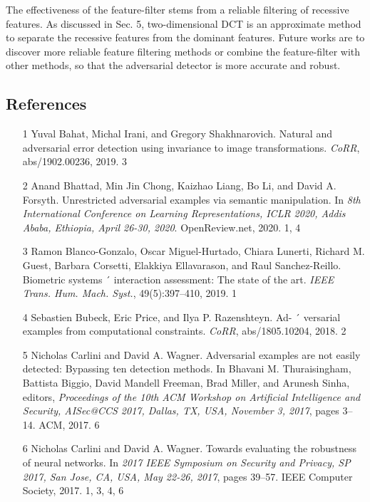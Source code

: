 \documentclass{article}
\begin{document}
The effectiveness of the feature-filter stems from a reliable filtering of recessive features. As discussed in Sec. 5, two-dimensional DCT is an approximate method to separate the recessive features from the dominant features. Future works are to discover more reliable feature filtering methods or combine the feature-filter with other methods, so that the adversarial detector is more accurate and robust.

\subsection{References}
\begin{itemize}
\item 
[1] Yuval Bahat, Michal Irani, and Gregory Shakhnarovich. Natural and adversarial error detection using invariance to image transformations. \textit{CoRR}, abs/1902.00236, 2019. 3

\item 
[2] Anand Bhattad, Min Jin Chong, Kaizhao Liang, Bo Li, and David A. Forsyth. Unrestricted adversarial examples via semantic manipulation. In \textit{8th International Conference on Learning Representations, ICLR 2020, Addis Ababa, Ethiopia, April 26-30, 2020}. OpenReview.net, 2020. 1, 4

\item 
[3] Ramon Blanco-Gonzalo, Oscar Miguel-Hurtado, Chiara Lunerti, Richard M. Guest, Barbara Corsetti, Elakkiya Ellavarason, and Raul Sanchez-Reillo. Biometric systems ´ interaction assessment: The state of the art. \textit{IEEE Trans. Hum. Mach. Syst.}, 49(5):397–410, 2019. 1

\item 
[4] Sebastien Bubeck, Eric Price, and Ilya P. Razenshteyn. Ad- ´ versarial examples from computational constraints. \textit{CoRR}, abs/1805.10204, 2018. 2

\item 
[5] Nicholas Carlini and David A. Wagner. Adversarial examples are not easily detected: Bypassing ten detection methods. In Bhavani M. Thuraisingham, Battista Biggio, David Mandell Freeman, Brad Miller, and Arunesh Sinha, editors, \textit{Proceedings of the 10th ACM Workshop on Artificial Intelligence and Security, AISec@CCS 2017, Dallas, TX, USA, November 3, 2017}, pages 3–14. ACM, 2017. 6

\item 
[6] Nicholas Carlini and David A. Wagner. Towards evaluating the robustness of neural networks. In \textit{2017 IEEE Symposium on Security and Privacy, SP 2017, San Jose, CA, USA, May 22-26, 2017}, pages 39–57. IEEE Computer Society, 2017. 1, 3, 4, 6


\end{itemize}
\end{document}
